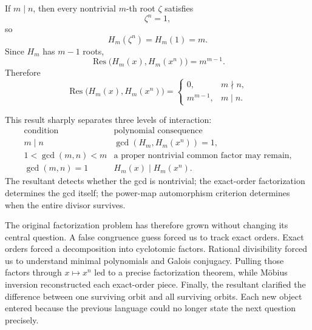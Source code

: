 If \(m\mid n\), then every nontrivial \(m\)-th root \(\zeta\) satisfies
\[
  \zeta^n=1,
\]
so
\[
  H_m(\zeta^n)=H_m(1)=m.
\]
Since \(H_m\) has \(m-1\) roots,
\[
  \operatorname{Res}\bigl(H_m(x),H_m(x^n)\bigr)
  =m^{m-1}.
\]
Therefore
\[
  \boxed{
  \operatorname{Res}\bigl(H_m(x),H_m(x^n)\bigr)
  =
  \begin{cases}
  0,&m\nmid n,\\
  m^{m-1},&m\mid n.
  \end{cases}}
\]

This result sharply separates three levels of interaction:
\[
\begin{array}{c|c}
\text{condition}&\text{polynomial consequence}\\ \hline
m\mid n&\gcd(H_m,H_m(x^n))=1,\\
1<\gcd(m,n)<m&\text{a proper nontrivial common factor may remain},\\
\gcd(m,n)=1&H_m(x)\mid H_m(x^n).
\end{array}
\]
The resultant detects whether the gcd is nontrivial; the exact-order factorization determines the gcd itself; the power-map automorphism criterion determines when the entire divisor survives.

The original factorization problem has therefore grown without changing its central question.  A false congruence guess forced us to track exact orders.  Exact orders forced a decomposition into cyclotomic factors.  Rational divisibility forced us to understand minimal polynomials and Galois conjugacy.  Pulling those factors through \(x\mapsto x^n\) led to a precise factorization theorem, while Möbius inversion reconstructed each exact-order piece.  Finally, the resultant clarified the difference between one surviving orbit and all surviving orbits.  Each new object entered because the previous language could no longer state the next question precisely.
